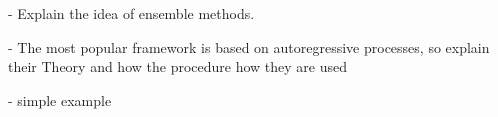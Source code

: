 - Explain the idea of ensemble methods.

- The most popular framework is based on
autoregressive processes, so explain their Theory
and how the procedure how they are used

- simple example